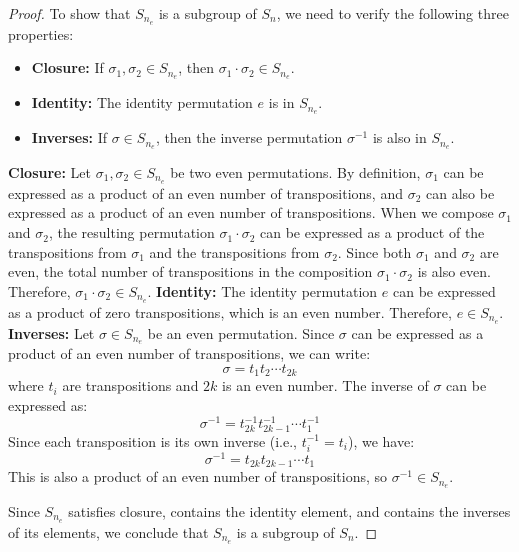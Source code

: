 \documentclass[openany]{book}
\begin{document}
\begin{proof}
    To show that \( S_{n_e} \) is a subgroup of \( S_n \), we need to verify the following three properties:
    \begin{itemize}
        \item \textbf{Closure:} If \( \sigma_1, \sigma_2 \in S_{n_e} \), then \( \sigma_1 \cdot \sigma_2 \in S_{n_e} \).
        \item \textbf{Identity:} The identity permutation \( e \) is in \( S_{n_e} \).
        \item \textbf{Inverses:} If \( \sigma \in S_{n_e} \), then the inverse permutation \( \sigma^{-1} \) is also in \( S_{n_e} \).
    \end{itemize}

    \textbf{Closure:} Let \( \sigma_1, \sigma_2 \in S_{n_e} \) be two even permutations. By definition, \( \sigma_1 \) can be expressed as a product of an even number of transpositions, and \( \sigma_2 \) can also be expressed as a product of an even number of transpositions. When we compose \( \sigma_1 \) and \( \sigma_2 \), the resulting permutation \( \sigma_1 \cdot \sigma_2 \) can be expressed as a product of the transpositions from \( \sigma_1 \) and the transpositions from \( \sigma_2 \). Since both \( \sigma_1 \) and \( \sigma_2 \) are even, the total number of transpositions in the composition \( \sigma_1 \cdot \sigma_2 \) is also even. Therefore, \( \sigma_1 \cdot \sigma_2 \in S_{n_e} \).
    \textbf{Identity:} The identity permutation \( e \) can be expressed as a product of zero transpositions, which is an even number. Therefore, \( e \in S_{n_e} \). \\
    \textbf{Inverses:} Let \( \sigma \in S_{n_e} \) be an even permutation. Since \( \sigma \) can be expressed as a product of an even number of transpositions, we can write:
    \[\sigma = t_1 t_2 \cdots t_{2k}\]
    where \( t_i \) are transpositions and \( 2k \) is an even number. The inverse of \( \sigma \) can be expressed as:
\[\sigma^{-1} = t_{2k}^{-1} t_{2k-1}^{-1} \cdots t_1^{-1}\]
    Since each transposition is its own inverse (i.e., \( t_i^{-1} = t_i \)), we have:
    \[\sigma^{-1} = t_{2k} t_{2k-1} \cdots t_1\]
    This is also a product of an even number of transpositions, so \( \sigma^{-1} \in S_{n_e} \).

    Since \( S_{n_e} \) satisfies closure, contains the identity element, and contains the inverses of its elements, we conclude that \( S_{n_e} \) is a subgroup of \( S_n \).
\end{proof}
\end{document}
